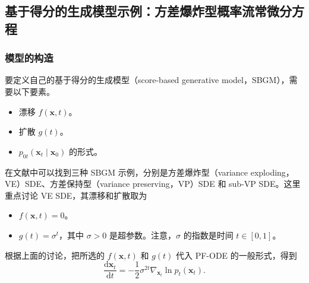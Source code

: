 
\subsection[基于得分的生成模型示例]{基于得分的生成模型示例：方差爆炸型概率流常微分方程}

\subsubsection{模型的构造}

要定义自己的基于得分的生成模型（score-based generative model，SBGM），需要以下要素。
\begin{itemize}
  \item 漂移 $f(\mathbf x,t)$。
  \item 扩散 $g(t)$。
  \item $p_{0t}(\mathbf x_t\mid\mathbf x_0)$ 的形式。
\end{itemize}
在文献中可以找到三种 SBGM 示例，分别是方差爆炸型（variance exploding，VE）SDE、方差保持型（variance preserving，VP）SDE 和 sub-VP SDE。这里重点讨论 VE SDE，其漂移和扩散取为
\begin{itemize}
  \item $f(\mathbf x,t)=0$。
  \item $g(t)=\sigma^t$，其中 $\sigma>0$ 是超参数。注意，$\sigma$ 的指数是时间 $t\in[0,1]$。
\end{itemize}
根据上面的讨论，把所选的 $f(\mathbf x,t)$ 和 $g(t)$ 代入 PF-ODE 的一般形式，得到
\begin{equation}
  \frac{\mathrm d\mathbf x_t}{\mathrm dt}
    =-\frac12\sigma^{2t}\nabla_{\mathbf x_t}\ln p_t(\mathbf x_t).
  \tag{9.31}\label{eq:09-31}
\end{equation}


